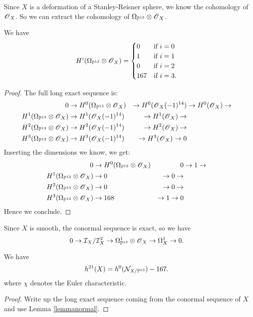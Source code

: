 \documentclass[11pt, english]{article}
\begin{document}
Since $X$ is a deformation of a Stanley-Reisner sphere, we know the cohomology of $\operatorname{\mathscr{O}}_X$. So we can extract the cohomology of $\Omega_{\mathbb{P}^{13}} \otimes \operatorname{\mathscr{O}}_X$.

\begin{lemma}
We have
\[
H^i(\Omega_{\mathbb{P}^{13}} \otimes \operatorname{\mathscr{O}}_X) = \begin{cases}
0 & \text{if } i=0 \\
1 & \text{if } i=1 \\
0 & \text{if } i=2 \\
167 & \text{if } i=3. \\
\end{cases}
\]
\end{lemma}
\begin{proof}
The full long exact sequence is:
\begin{align*}
0 & \to H^0(\Omega_{\mathbb{P}^{13}} \otimes \operatorname{\mathscr{O}}_X) &\to H^0(\operatorname{\mathscr{O}}_X(-1)^{14}) &\to H^0(\operatorname{\mathscr{O}}_X) \to \\
H^1(\Omega_{\mathbb{P}^{13}} \otimes \operatorname{\mathscr{O}}_X) &\to H^1(\operatorname{\mathscr{O}}_X(-1)^{14}) &\to H^1(\operatorname{\mathscr{O}}_X) \to \\
 H^2(\Omega_{\mathbb{P}^{13}} \otimes \operatorname{\mathscr{O}}_X) &\to H^2(\operatorname{\mathscr{O}}_X(-1)^{14}) &\to H^2(\operatorname{\mathscr{O}}_X) \to \\
 H^3(\Omega_{\mathbb{P}^{13}} \otimes \operatorname{\mathscr{O}}_X) &\to H^3(\operatorname{\mathscr{O}}_X(-1)^{14}) &\to H^3(\operatorname{\mathscr{O}}_X) \to 0
\end{align*}
Inserting the dimensions we know, we get:
\begin{align*}
0 & \to H^0(\Omega_{\mathbb{P}^{13}} \otimes \operatorname{\mathscr{O}}_X) & 0  &\to 1 \to \\
H^1(\Omega_{\mathbb{P}^{13}} \otimes \operatorname{\mathscr{O}}_X) &\to 0 &\to 0 \to \\
 H^2(\Omega_{\mathbb{P}^{13}} \otimes \operatorname{\mathscr{O}}_X) &\to 0 &\to 0 \to \\
 H^3(\Omega_{\mathbb{P}^{13}} \otimes \operatorname{\mathscr{O}}_X) &\to 168  &\to 1 \to 0
\end{align*}
Hence we conclude.
\end{proof}

Since $X$ is smooth, the conormal sequence is exact, so we have
\[
0 \to \mathcal I_X/\mathcal I_X^2 \to \Omega^1_{\mathbb{P}^{13}} \otimes \operatorname{\mathscr{O}}_X \to \Omega_X^1 \to 0.
\]

\begin{lemma}
\label{lemmah21}
We have
\[
h^{21}(X) = h^0(\mathcal N_{X/\mathbb{P}^{13}})-167.
\]
where $\chi$ denotes the Euler characteristic.
\end{lemma}
\begin{proof}
Write up the long exact sequence coming from the conormal sequence of $X$ and use Lemma \ref{lemmanormal}.
\end{proof}
\end{document}
